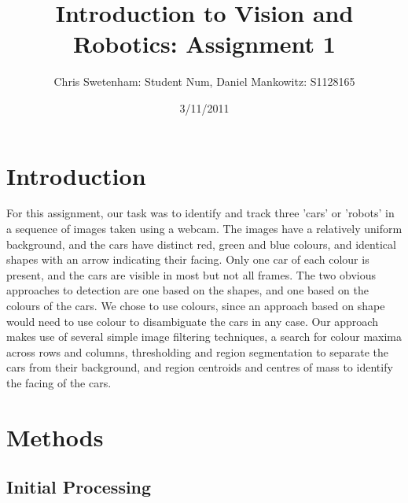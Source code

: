 \documentclass{article}
\title{Introduction to Vision and Robotics: Assignment 1}
\author{Chris Swetenham: Student Num, Daniel Mankowitz: S1128165}
\date{3/11/2011}
\begin{document}
\maketitle

\section{Introduction}
\label{sec:introduction}
For this assignment, our task was to identify and track three 'cars' or 'robots' in a sequence of images taken using a webcam. The images have a relatively uniform background, and the cars have distinct red, green and blue colours, and identical shapes with an arrow indicating their facing. Only one car of each colour is present, and the cars are visible in most but not all frames.
The two obvious approaches to detection are one based on the shapes, and one based on the colours of the cars. We chose to use colours, since an approach based on shape would need to use colour to disambiguate the cars in any case.
Our approach makes use of several simple image filtering techniques, a search for colour maxima across rows and columns, thresholding and region segmentation to separate the cars from their background, and region centroids and centres of mass to identify the facing of the cars.

\section{Methods}
\label{sec:methods}





\subsection{Initial Processing}
\label{sec:processing}
\end{document}
